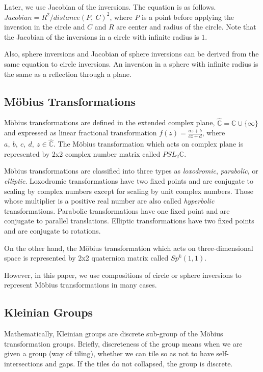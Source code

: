 Later, we use Jacobian of the inversions. The equation is as follows.
$Jacobian = R^2 / distance(P,~C)^2$, where $P$ is a point before
applying the inversion in the circle and $C$ and $R$ are center and
radius of the circle.
Note that the Jacobian of the inversions in a circle with
infinite radius is $1$.

Also, sphere inversions and Jacobian of sphere inversions can be
derived from the same equation to circle inversions.
An inversion in a sphere with infinite radius is the same as a reflection
through a plane.

\subsection{M\"obius Transformations}

M\"obius transformations are defined in the extended complex plane,
$\hat{\mathbb{C}} = \mathbb{C} \cup \{\infty\}$ and expressed as linear
fractional transformation
$f(z)=\frac{az + b}{cz + d}$, where $a,~b,~c,~d,~z \in \hat{\mathbb{C}}$.
The M\"obius transformation which acts on complex plane is represented
by 2x2 complex number matrix called $PSL_2\mathbb{C}$.

M\"obius transformations are classified into three types as \textit{loxodromic},
\textit{parabolic}, or \textit{elliptic}.
Loxodromic transformations have two fixed points and are conjugate to
scaling by complex numbers except for scaling by unit complex numbers.
Those whose multiplier is a positive real number
are also called \textit{hyperbolic} transformations. Parabolic transformations
have one fixed point and are conjugate to parallel translations.
Elliptic transformations have two fixed points and are conjugate to rotations.

On the other hand, the M\"obius transformation which acts on
three-dimensional space is represented
by 2x2 quaternion matrix called $Sp^k(1, 1)$.

However, in this paper, we use compositions of circle or sphere
inversions to represent M\"obius transformations in many cases.

\subsection{Kleinian Groups}

Mathematically, Kleinian groups are discrete sub-group of the M\"obius transformation
groups. 
Briefly, discreteness of the group means when we are given a group (way of tiling),
whether we can tile so as not to have self-intersections and gaps.
If the tiles do not collapsed, the group is discrete.

